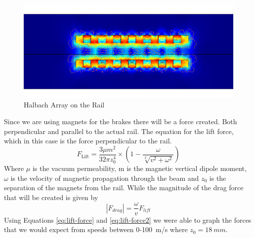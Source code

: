 \documentclass[main.tex]{subfiles}
\begin{document}
    \begin{figure}
        \centering
        \includegraphics[width=\linewidth]{images/halbach_array.png}
        \caption{Halbach Array on the Rail}
        \label{fig:halbach-array}
    \end{figure}
     Since we are using magnets for the brakes there will be a force created. Both perpendicular and parallel to the actual rail. The equation for the lift force, which in this case is the force perpendicular to the rail.
     \begin{equation}\label{eq:lift-force}
     F_{\textrm{Lift}} = \frac{3\mu m^2}{32\pi z_0^4}\times\left(1 -\frac{\omega}{\sqrt[2]{v^2+\omega^2}}\right)
    \end{equation}
    Where $\mu$ is the vacuum permeability, m is the magnetic vertical dipole moment, $\omega$ is the velocity of magnetic propagation through the beam and $z_0$ is the separation of the magnets from the rail. While the magnitude of the drag force that will be created is given by
    \begin{equation}\label{eq:lift-force2}
    \left\lvert F_{drag}\right\rvert = \frac{\omega}{v} F_{lift}
    \end{equation}
     Using Equations \ref{eq:lift-force} and \ref{eq:lift-force2} we were able to graph the forces that we would expect from speeds between 0-\SI{100}{m/s} where $z_0 = \SI{18}{mm}$.\\
\end{document}
